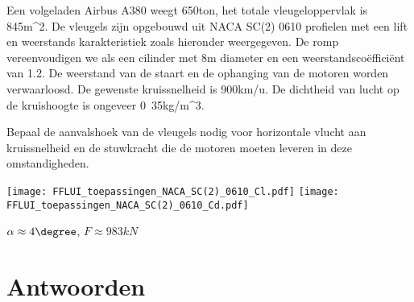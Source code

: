 	\begin{toepassing*}
		\label{airbus}
		Een volgeladen Airbus A380 weegt \unit{650}{ton}, het totale vleugeloppervlak is \unit{845}{m^2}. De vleugels zijn opgebouwd uit NACA SC(2) 0610 profielen met een lift en weerstands karakteristiek zoals hieronder weergegeven. De romp vereenvoudigen we als een cilinder met 8m diameter en een weerstandsco\"effici\"ent van 1.2. De weerstand van de staart en de ophanging van de motoren worden verwaarloosd. De gewenste kruissnelheid is \unit{900}{km/u}. De dichtheid van lucht op de kruishoogte is ongeveer \unit{0.35}{kg/m^3}.
		
		Bepaal de aanvalshoek van de vleugels nodig voor horizontale vlucht aan kruissnelheid en de stuwkracht die de motoren moeten leveren in deze omstandigheden.

		\texttt{[image: FFLUI\_toepassingen\_NACA\_SC(2)\_0610\_Cl.pdf]}
		\texttt{[image: FFLUI\_toepassingen\_NACA\_SC(2)\_0610\_Cd.pdf]}
	\end{toepassing*}
	\begin{antwoord}
		$\alpha \approx \unit{4}{\degree}$, $F \approx \unit{983}{kN}$
	\end{antwoord}



	\section*{Antwoorden}
	\begin{multicols}{2}
	\end{multicols}